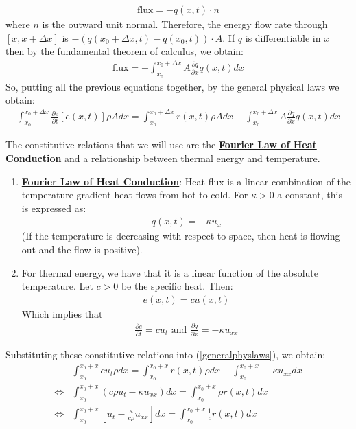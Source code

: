 \documentclass[11pt]{scrartcl}
\theoremstyle{definition}
\theoremstyle{remark}
\newcommand{\dfn}[1]{\textbf{\underline{#1}}}
\newcommand{\idx}[2]{\int_{#1}^{#2}}
\begin{document}
\begin{enumerate}[noitemsep]
	\begin{align*}
		\text{flux} = -q(x,t) \cdot n
	\end{align*}
	where $n$ is the outward unit normal. Therefore, the energy flow rate through $[x, x+ \Delta x]$ is $-(q(x_0+ \Delta x, t) - q(x_0, t)) \cdot A$. If $q$ is differentiable in $x$ then by the fundamental theorem of calculus, we obtain: 
	\begin{align}
		\text{flux} = - \idx{x_0}{x_0 + \Delta x} A \frac{\partial q}{\partial x} q(x,t) dx 	
	\end{align}
	So, putting all the previous equations together, by the general physical laws we obtain: 
	\begin{align}\label{generalphyslaws}
		\idx{x_0}{x_0 + \Delta x} \frac{\partial e}{\partial t} [ e(x,t)] \rho A dx = \idx{x_0}{x_0 + \Delta x} r(x,t) \rho A dx - \idx{x_0}{x_0 + \Delta x} A \frac{\partial q}{\partial x} q(x,t) dx
	\end{align}

\end{enumerate}
The constitutive relations that we will use are the \dfn{Fourier Law of Heat Conduction} and a relationship between thermal energy and temperature. 
\begin{enumerate}[noitemsep]
	\item \dfn{Fourier Law of Heat Conduction}: Heat flux is a linear combination of the temperature gradient heat flows from hot to cold. For $\kappa >0$ a constant, this is expressed as: 
	\begin{align}
		q(x,t) = - \kappa u_x	
	\end{align}
	(If the temperature is decreasing with respect to space, then heat is flowing out and the flow is positive). 
	\item For thermal energy, we have that it is a linear function of the absolute temperature. Let $c > 0$ be the specific heat. Then: 
	\begin{align}
		e(x,t) = cu(x,t) 
	\end{align}
	Which implies that
	\begin{align*}
		\frac{\partial e}{\partial t} = cu_t \text{ and } \frac{\partial q}{\partial x} = - \kappa u_{xx} 	
	\end{align*}
\end{enumerate}
	Substituting these constitutive relations into (\ref{generalphyslaws}), we obtain: 
\begin{align*}
	 & \idx{x_0}{x_0 + x} cu_t \rho dx = \idx{x_0}{x_0 + x}  r(x,t) \rho dx - \idx{x_0}{x_0 + x}  - \kappa u_{xx} dx \\
	\iff & \idx{x_0}{x_0 + x}  ( c \rho u_t - \kappa u_{xx} ) dx = \idx{x_0}{x_0 + x}  \rho r(x,t) dx \\
	\iff & \idx{x_0}{x_0 + x}  \left[ u_t - \frac{\kappa}{c \rho} u_{xx} \right] dx = \idx{x_0}{x_0 + x}  \frac{1}{c} r(x,t) dx 
\end{align*}
\end{document}
